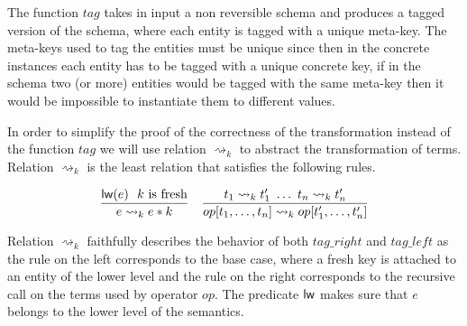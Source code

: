 \documentclass{article}[12pt,a4paper]
\theoremstyle{definition}
\begin{document}
The function $tag$ takes in input a non reversible schema and produces a
tagged version of the schema, where each entity is tagged with a unique meta-key. The meta-keys used to tag the
entities must be unique since then in the concrete instances each entity has to
be tagged with a unique concrete key, if in the schema two (or more) entities
would be tagged with the same meta-key then it would be impossible to
instantiate them to different values.

In order to simplify the proof of the correctness of the transformation instead
of the function $tag$ we will use relation $\rightsquigarrow_k$ to abstract the
transformation of terms. Relation $\rightsquigarrow_k$ is the least relation that
satisfies the following rules.

\[
  \begin{array}{ll}
    \displaystyle
    \frac{\mathsf{lw}(e)~~k\text{ is fresh}}
    { e \rightsquigarrow_k e * k }
    &
      \displaystyle
      \frac{t_1 \rightsquigarrow_k t'_1~\ldots~t_n\rightsquigarrow_k t'_n}
      { op[t_1,\ldots,t_n] \rightsquigarrow_k op[t'_1,\ldots,t'_n] }
  \end{array}
\]

Relation $\rightsquigarrow_k$ faithfully describes the behavior of both $tag\_right$
and $tag\_left$ as the rule on the left corresponds to the base case, where a
fresh key is attached to an entity of the lower level and the rule on the right
corresponds to the recursive call on the terms used by operator $op$. The
predicate $\mathsf{lw}$ makes sure that $e$ belongs to the lower level of the semantics.
\end{document}
